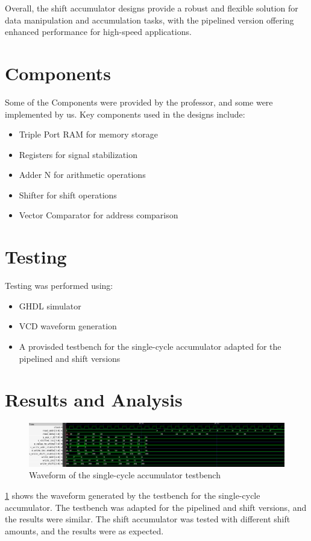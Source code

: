 \documentclass[a4paper,12pt]{article}
\begin{document}
Overall, the shift accumulator designs provide a robust and flexible solution for data manipulation and accumulation tasks, with the pipelined version offering enhanced performance for high-speed applications.

\section{Components}
Some of the Components were provided by the professor, and some were 
implemented by us.
Key components used in the designs include:
\begin{itemize}
    \item Triple Port RAM for memory storage
    \item Registers for signal stabilization
    \item Adder N for arithmetic operations
    \item Shifter for shift operations
    \item Vector Comparator for address comparison
\end{itemize}

\section{Testing}
Testing was performed using:
\begin{itemize}
    \item GHDL simulator
    \item VCD waveform generation
    \item A provisded testbench for the single-cycle accumulator adapted for the pipelined and shift versions
\end{itemize}

\section{Results and Analysis}
\begin{figure}[H]
    \centering
    \includegraphics[width=0.8\linewidth]{waveform.png}
    \caption{Waveform of the single-cycle accumulator testbench}
    \label{fig:waveform}
\end{figure}

\ref{fig:waveform} shows the waveform generated by the testbench for the single-cycle accumulator. The testbench was adapted for the pipelined and shift versions, and the results were similar. The shift accumulator was tested with different shift amounts, and the results were as expected.
\end{document}
